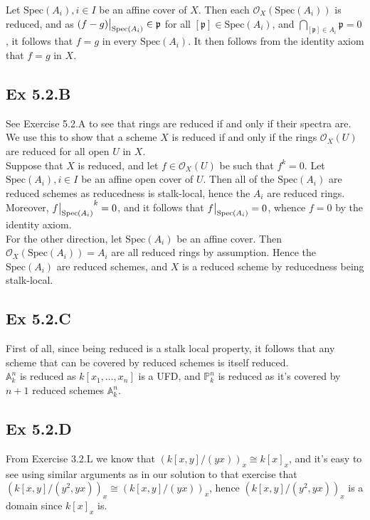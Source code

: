 \documentclass{article}
\newcommand\restr[2]{{%
  \left.\kern-\nulldelimiterspace %
  #1 %
  \vphantom{\big|} %
  \right|_{#2} %
  }}
\theoremstyle{definition}
\renewcommand{\P}{\mathbb{P}}
\newcommand{\A}{\mathbb{A}}
\newcommand{\oo}{\mathcal{O}}
\newcommand{\Spec}{\text{Spec}}
\begin{document}
Let $\Spec(A_i), i \in I$ be an affine cover of $X$. Then each
$\oo_X(\Spec(A_i))$ is reduced, and as $\restr{(f - g)}{\Spec(A_i)} \in
\mathfrak{p}$ for all $[\mathfrak{p}] \in \Spec(A_i)$, and
$\bigcap_{[\mathfrak{p}] \in A_i} \mathfrak{p} = 0$, it follows that $f = g$ in
every $\Spec(A_i)$. It then follows from the identity axiom that $f = g$ in
$X$. \\

\subsection*{Ex 5.2.B}

See Exercise 5.2.A to see that rings are reduced if and only if their spectra
are. We use this to show that a scheme $X$ is reduced if and only if the rings
$\mathcal{O}_X(U)$ are reduced for all open $U$ in $X$. \\

Suppose that $X$ is reduced, and let $f \in \mathcal{O}_X(U)$ be such that $f^k
= 0$. Let $\Spec(A_i), i \in I$ be an affine open cover of $U$. Then all of the
$\Spec(A_i)$ are reduced schemes as reducedness is stalk-local, hence the $A_i$
are reduced rings. Moreover, $\restr{f}{\Spec(A_i)}^k = 0$, and it follows that
$\restr{f}{\Spec(A_i)} = 0$, whence $f = 0$ by the identity axiom. \\

For the other direction, let $\Spec(A_i)$ be an affine cover. Then
$\mathcal{O}_X(\Spec(A_i)) = A_i$ are all reduced rings by assumption. Hence
the $\Spec(A_i)$ are reduced schemes, and $X$ is a reduced scheme by
reducedness being stalk-local.

\subsection*{Ex 5.2.C}

First of all, since being reduced is a stalk local property, it follows that any
scheme that can be covered by reduced schemes is itself reduced. \\

$\A_{k}^{n}$ is reduced as $k[x_1,\ldots,x_n]$ is a UFD, and $\P_{k}^{n}$ is
reduced as it's covered by $n + 1$ reduced schemes $\A_{k}^{n}$. 

\subsection*{Ex 5.2.D}

From Exercise 3.2.L we know that $(k[x, y]/(yx))_x \cong k[x]_x$, and it's easy
to see using similar arguments as in our solution to that exercise that $(k[x,
y]/(y^2, yx))_x \cong (k[x, y]/(yx))_x$, hence $(k[x, y]/(y^2, yx))_x$ is a
domain since $k[x]_x$ is. \\
\end{document}
